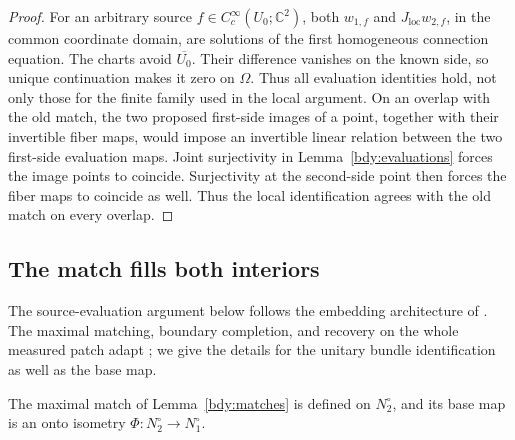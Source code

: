 \begin{proof}
For an arbitrary source \(f\in C_c^\infty(U_0;\mathbb C^2)\),
both \(w_{1,f}\) and \(J_{\mathrm{loc}}w_{2,f}\), in the common
coordinate domain, are solutions of the first homogeneous
connection equation.  The charts avoid \(\overline{U_0}\).
Their difference vanishes on the known side, so unique
continuation makes it zero on \(\Omega\).  Thus all evaluation
identities hold, not only those for the finite family used in
the local argument.  On an overlap with the old match, the two
proposed first-side images of a point, together with their invertible fiber maps,
would impose an invertible linear relation between the two
first-side evaluation maps.  Joint surjectivity in
Lemma~\ref{bdy:evaluations} forces the image points to coincide.
Surjectivity at the second-side point then forces the fiber maps
to coincide as well.  Thus the local identification agrees with
the old match on every overlap.
\end{proof}

\subsection{The match fills both interiors}

The source-evaluation argument below follows the embedding architecture
of \cite[Section~6.1]{LLS20}.  The maximal matching, boundary completion,
and recovery on the whole measured patch adapt
\cite[Section~7]{ScalarCompanion2026}; we give the details for the
unitary bundle identification as well as the base map.

\begin{proposition}\label{glob:interior}
The maximal match of Lemma~\ref{bdy:matches} is defined on
\(N_2^\circ\), and its base map is an onto isometry
\(\Phi:N_2^\circ\to N_1^\circ\).
\end{proposition}

